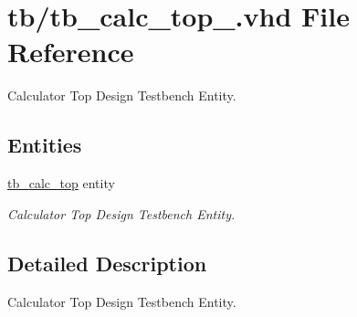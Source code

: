 \hypertarget{tb__calc__top___8vhd}{}\section{tb/tb\+\_\+calc\+\_\+top\+\_\+.vhd File Reference}
\label{tb__calc__top___8vhd}


Calculator Top Design Testbench Entity.  


\subsection*{Entities}
\begin{DoxyCompactItemize}
\item 
\hyperlink{classtb__calc__top}{tb\+\_\+calc\+\_\+top} entity
\begin{DoxyCompactList}\small\item\em Calculator Top Design Testbench Entity. \end{DoxyCompactList}\end{DoxyCompactItemize}


\subsection{Detailed Description}
Calculator Top Design Testbench Entity. 

